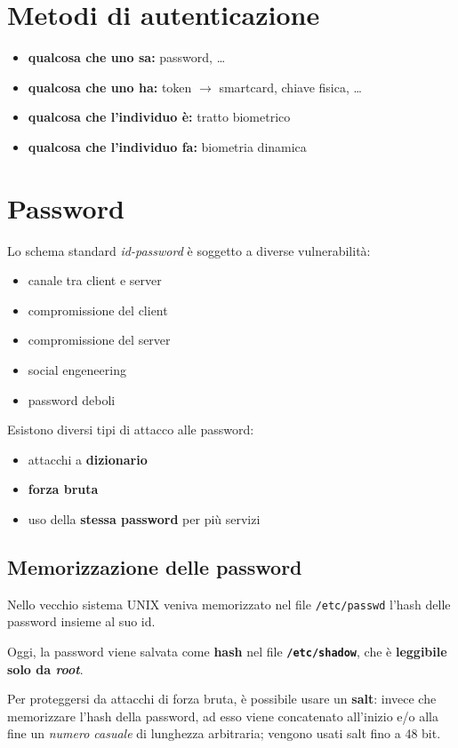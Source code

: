 \section{Metodi di autenticazione}
\begin{itemize}
    \item \textbf{qualcosa che uno sa:} password, \dots
    \item \textbf{qualcosa che uno ha:} token $\rightarrow$ smartcard, chiave fisica, \dots
    \item \textbf{qualcosa che l'individuo è:} tratto biometrico
    \item \textbf{qualcosa che l'individuo fa:} biometria dinamica
\end{itemize}

\section{Password}
Lo schema standard \textit{id-password} è soggetto a diverse vulnerabilità:
\begin{itemize}
    \item canale tra client e server 
    \item compromissione del client 
    \item compromissione del server 
    \item social engeneering 
    \item password deboli 
\end{itemize}

\noindent Esistono diversi tipi di attacco alle password:
\begin{itemize}
    \item attacchi a \textbf{dizionario} 
    \item \textbf{forza bruta}
    \item uso della \textbf{stessa password} per più servizi
\end{itemize}

\subsection{Memorizzazione delle password}
Nello vecchio sistema UNIX veniva memorizzato nel file \texttt{/etc/passwd} l'hash delle password 
insieme al suo id.

\noindent Oggi, la password viene salvata come \textbf{hash} nel file \textbf{\texttt{/etc/shadow}},
che è \textbf{leggibile solo da \textit{root}}.

\noindent Per proteggersi da attacchi di forza bruta, è possibile usare un \textbf{salt}: invece che memorizzare 
l'hash della password, ad esso viene concatenato all'inizio e/o alla fine un \textit{numero casuale} di 
lunghezza arbitraria; vengono usati salt fino a 48 bit.

